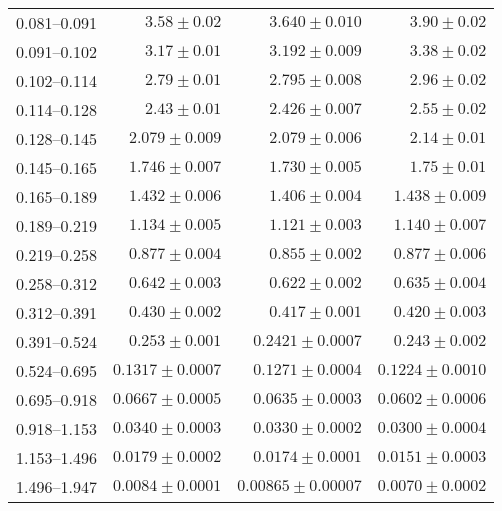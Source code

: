 \begin{table}
\begin{center}
\begin{tabular}{@{}l r r r@{}}
            0.081--0.091  &  $3.58     \pm  0.02$     &  $3.640    \pm  0.010$    &  $3.90     \pm  0.02$     \\
            0.091--0.102  &  $3.17     \pm  0.01$     &  $3.192    \pm  0.009$    &  $3.38     \pm  0.02$     \\
            0.102--0.114  &  $2.79     \pm  0.01$     &  $2.795    \pm  0.008$    &  $2.96     \pm  0.02$     \\
            0.114--0.128  &  $2.43     \pm  0.01$     &  $2.426    \pm  0.007$    &  $2.55     \pm  0.02$     \\
            0.128--0.145  &  $2.079    \pm  0.009$    &  $2.079    \pm  0.006$    &  $2.14     \pm  0.01$     \\
            0.145--0.165  &  $1.746    \pm  0.007$    &  $1.730    \pm  0.005$    &  $1.75     \pm  0.01$     \\
            0.165--0.189  &  $1.432    \pm  0.006$    &  $1.406    \pm  0.004$    &  $1.438    \pm  0.009$    \\
            0.189--0.219  &  $1.134    \pm  0.005$    &  $1.121    \pm  0.003$    &  $1.140    \pm  0.007$    \\
            0.219--0.258  &  $0.877    \pm  0.004$    &  $0.855    \pm  0.002$    &  $0.877    \pm  0.006$    \\
            0.258--0.312  &  $0.642    \pm  0.003$    &  $0.622    \pm  0.002$    &  $0.635    \pm  0.004$    \\
            0.312--0.391  &  $0.430    \pm  0.002$    &  $0.417    \pm  0.001$    &  $0.420    \pm  0.003$    \\
            0.391--0.524  &  $0.253    \pm  0.001$    &  $0.2421   \pm  0.0007$   &  $0.243    \pm  0.002$    \\
            0.524--0.695  &  $0.1317   \pm  0.0007$   &  $0.1271   \pm  0.0004$   &  $0.1224   \pm  0.0010$   \\
            0.695--0.918  &  $0.0667   \pm  0.0005$   &  $0.0635   \pm  0.0003$   &  $0.0602   \pm  0.0006$   \\
            0.918--1.153  &  $0.0340   \pm  0.0003$   &  $0.0330   \pm  0.0002$   &  $0.0300   \pm  0.0004$   \\
            1.153--1.496  &  $0.0179   \pm  0.0002$   &  $0.0174   \pm  0.0001$   &  $0.0151   \pm  0.0003$   \\
            1.496--1.947  &  $0.0084   \pm  0.0001$   &  $0.00865  \pm  0.00007$  &  $0.0070   \pm  0.0002$   \\

\end{tabular}
\end{center}
\end{table}
